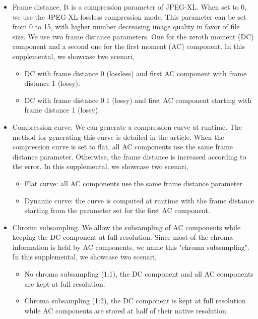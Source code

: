 \begin{itemize}
    \item Frame distance. It is a compression parameter of JPEG-XL. When set to 0, we use the JPEG-XL lossless compression mode. This parameter can be set from 0 to 15, with higher number decreasing image quality in favor of file size. We use two frame distance parameters. One for the zeroth moment (DC) component and a second one for the first moment (AC) component. In this supplemental, we showcase two scenari,
    \begin{itemize}
        \item DC with frame distance 0 (lossless) and first AC component with frame distance 1 (lossy).
        \item DC with frame distance 0.1 (lossy) and first AC component starting with frame distance 1 (lossy).
    \end{itemize}
    \item Compression curve. We can generate a compression curve at runtime. The method for generating this curve is detailed in the article. When the compression curve is set to flat, all AC components use the same frame distance parameter. Otherwise, the frame distance is increased according to the error. In this supplemental, we showcase two scenari,
    \begin{itemize}
        \item Flat curve: all AC components use the same frame distance parameter.
        \item Dynamic curve: the curve is computed at runtime with the frame distance starting from the parameter set for the first AC component.
    \end{itemize}
    \item Chroma subsampling. We allow the subsampling of AC components while keeping the DC component at full resolution. Since most of the chroma information is held by AC components, we name this "chroma subsampling". In this supplemental, we showcase two scenari,
        \begin{itemize}
            \item No chroma subsampling (1:1), the DC component and all AC components are kept at full resolution.
            \item Chroma subsampling (1:2), the DC component is kept at full resolution while AC components are stored at half of their native resolution.
        \end{itemize}
\end{itemize}


